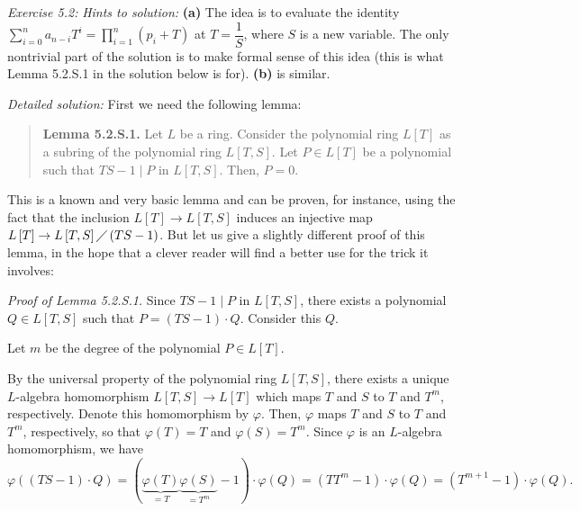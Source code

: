 \documentclass[numbers=enddot,12pt,final,onecolumn,notitlepage]{scrartcl}%
\begin{document}
\textit{Exercise 5.2:} \textit{Hints to solution:} \textbf{(a)} The idea is to
evaluate the identity $\sum\limits_{i=0}^{n}a_{n-i}T^{i}=\prod\limits_{i=1}%
^{n}\left(  p_{i}+T\right)  $ at $T=\dfrac{1}{S}$, where $S$ is a new
variable. The only nontrivial part of the solution is to make formal sense of
this idea (this is what Lemma 5.2.S.1 in the solution below is for).
\textbf{(b)} is similar.

\textit{Detailed solution:} First we need the following lemma:

\begin{quote}
\textbf{Lemma 5.2.S.1.} Let $L$ be a ring. Consider the polynomial ring
$L\left[  T\right]  $ as a subring of the polynomial ring $L\left[
T,S\right]  $. Let $P\in L\left[  T\right]  $ be a polynomial such that
$TS-1\mid P$ in $L\left[  T,S\right]  $. Then, $P=0$.
\end{quote}

This is a known and very basic lemma and can be proven, for instance, using
the fact that the inclusion $L\left[  T\right]  \rightarrow L\left[
T,S\right]  $ induces an injective map $L\left[  T\right]  \rightarrow
L\left[  T,S\right]  \diagup\left(  TS-1\right)  $. But let us give a slightly
different proof of this lemma, in the hope that a clever reader will find a
better use for the trick it involves:

\textit{Proof of Lemma 5.2.S.1.} Since $TS-1\mid P$ in $L\left[  T,S\right]
$, there exists a polynomial $Q\in L\left[  T,S\right]  $ such that $P=\left(
TS-1\right)  \cdot Q$. Consider this $Q$.

Let $m$ be the degree of the polynomial $P\in L\left[  T\right]  $.

By the universal property of the polynomial ring $L\left[  T,S\right]  $,
there exists a unique $L$-algebra homomorphism $L\left[  T,S\right]
\rightarrow L\left[  T\right]  $ which maps $T$ and $S$ to $T$ and $T^{m}$,
respectively. Denote this homomorphism by $\varphi$. Then, $\varphi$ maps $T$
and $S$ to $T$ and $T^{m}$, respectively, so that $\varphi\left(  T\right)
=T$ and $\varphi\left(  S\right)  =T^{m}$. Since $\varphi$ is an $L$-algebra
homomorphism, we have
\[
\varphi\left(  \left(  TS-1\right)  \cdot Q\right)  =\left(
\underbrace{\varphi\left(  T\right)  }_{=T}\underbrace{\varphi\left(
S\right)  }_{=T^{m}}-1\right)  \cdot\varphi\left(  Q\right)  =\left(
TT^{m}-1\right)  \cdot\varphi\left(  Q\right)  =\left(  T^{m+1}-1\right)
\cdot\varphi\left(  Q\right)  .
\]
\end{document}
